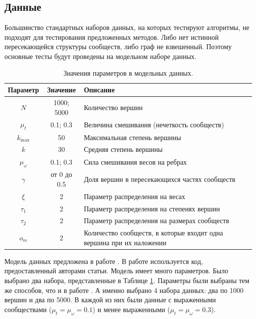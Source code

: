 \documentclass{ITaSconf}
\begin{document}
	\subsection{Данные}
	Большинство стандартных наборов данных, на которых тестируют алгоритмы, не подходят для тестирования предложенных методов.
	Либо нет истинной пересекающейся структуры сообществ, либо граф не взвешенный. 
	Поэтому основные тесты будут проведены на модельном наборе данных.
	\begin{center}
		\begin{table}[!th]
			\centering
			\begin{tabular}{ c c l }
				\hline
				\hline
				\textbf{Параметр} & \textbf{Значение} & \textbf{Описание} \\
				\hline
				$N$				& 1000; 5000 	& Количество вершин	\\[2px]
				$\mu_t$			& 0.1; 0.3 		& Величина смешивания (нечеткость сообществ)\\[2px]
				$k_{\max}$		& 50 			& Максимальная степень вершины\\[2px]
				$k$				& 30	 		& Средняя степень вершины\\[2px]
				$\mu_{\omega}$	& 0.1; 0.3 		& Сила смешивания весов на ребрах\\[2px]
				$\gamma$		& от 0 до 0.5 	& Доля вершин в пересекающихся частях сообществ\\[2px]
				$\xi$			& 2 			& Параметр распределения на весах\\[2px]
				$\tau_1$		& 2 			& Параметр распределения на степенях вершин\\[2px]
				$\tau_2$		& 2 			& Параметр распределения на размерах сообществ\\[2px]
				$o_m$			& 2 			& Количество сообществ, в которые входит одна вершина при их наложении \\
				\hline
				\hline
			\end{tabular}
			\centering
			\caption{Значения параметров в модельных данных. }
			\label{table:bench_params}
		\end{table}
	\end{center}
	Модель данных предложена в работе \cite{lancichinetti2009benchmarks}. 
	В работе используется код, предоставленный авторами статьи. 
	Модель имеет много параметров. 
	Было выбрано два набора, представленные в Таблице \ref{table:bench_params}. 
	Параметры были выбраны тем же способов, что и в работе \cite{lu2015algorithms}. А именно выбрано 4 набора данных: два по 1000 вершин и два по 5000. В каждой из них были данные с выраженными сообществами ($\mu_t=\mu_{\omega}=0.1$) и менее выраженными ($\mu_t=\mu_{\omega}=0.3$).
	
\end{document}

